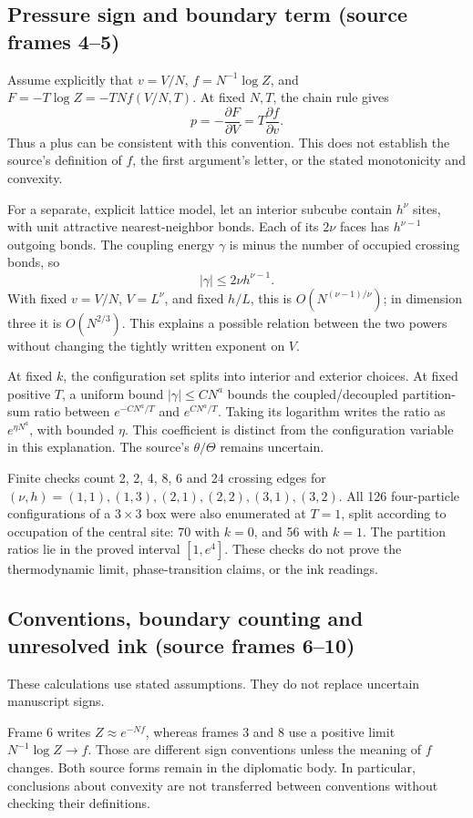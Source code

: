 \documentclass[11pt]{article}
\begin{document}
\subsection*{Pressure sign and boundary term (source frames 4–5)}
Assume explicitly that \(v=V/N\), \(f=N^{-1}\log Z\), and \(F=-T\log Z=-TNf(V/N,T)\). At fixed \(N,T\), the chain rule gives
\[p=-\frac{\partial F}{\partial V}=T\frac{\partial f}{\partial v}.\]
Thus a plus can be consistent with this convention. This does not establish the source's definition of \(f\), the first argument's letter, or the stated monotonicity and convexity.

For a separate, explicit lattice model, let an interior subcube contain \(h^\nu\) sites, with unit attractive nearest-neighbor bonds. Each of its \(2\nu\) faces has \(h^{\nu-1}\) outgoing bonds. The coupling energy \(\gamma\) is minus the number of occupied crossing bonds, so
\[|\gamma|\le 2\nu h^{\nu-1}.\]
With fixed \(v=V/N\), \(V=L^\nu\), and fixed \(h/L\), this is \(O(N^{(\nu-1)/\nu})\); in dimension three it is \(O(N^{2/3})\). This explains a possible relation between the two powers without changing the tightly written exponent on \(V\).

At fixed \(k\), the configuration set splits into interior and exterior choices. At fixed positive \(T\), a uniform bound \(|\gamma|\le CN^a\) bounds the coupled/decoupled partition-sum ratio between \(e^{-CN^a/T}\) and \(e^{CN^a/T}\). Taking its logarithm writes the ratio as \(e^{\eta N^a}\), with bounded \(\eta\). This coefficient is distinct from the configuration variable in this explanation. The source's \(\theta/\Theta\) remains uncertain.

Finite checks count 2, 2, 4, 8, 6 and 24 crossing edges for \((\nu,h)=(1,1),(1,3),(2,1),(2,2),(3,1),(3,2)\). All 126 four-particle configurations of a \(3\times3\) box were also enumerated at \(T=1\), split according to occupation of the central site: 70 with \(k=0\), and 56 with \(k=1\). The partition ratios lie in the proved interval \([1,e^4]\). These checks do not prove the thermodynamic limit, phase-transition claims, or the ink readings.

\subsection*{Conventions, boundary counting and unresolved ink (source frames 6–10)}
These calculations use stated assumptions. They do not replace uncertain manuscript signs.

Frame 6 writes \(Z\approx e^{-Nf}\), whereas frames 3 and 8 use a positive limit \(N^{-1}\log Z\to f\). Those are different sign conventions unless the meaning of \(f\) changes. Both source forms remain in the diplomatic body. In particular, conclusions about convexity are not transferred between conventions without checking their definitions.
\end{document}
